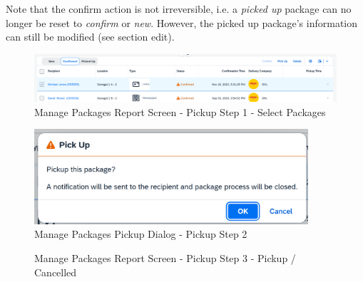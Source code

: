 Note that the confirm action is not irreversible, i.e. a \textit{picked up} package can no longer be reset to \textit{confirm} or \textit{new}. However, the picked up package's information can still be modified (see section edit).

\begin{figure}[H]
	\centering
	\includegraphics[width=1\linewidth]{images/user_doc/managePack/ReportScreen/pickup/pickupEnabled.png}
	\caption{Manage Packages Report Screen - Pickup Step 1 - Select Packages}
	\label{fig:MPReportPickupBtn}
\end{figure}

\begin{figure}[H]
	\centering
	\includegraphics[height=100pt]{images/user_doc/managePack/ReportScreen/pickup/pickupDialogOk.png}
	\caption{Manage Packages Pickup Dialog - Pickup Step 2}
	\label{fig:MPReportPickupDlg}
\end{figure}

\begin{figure}[H]
	\centering
	\hspace{5pt}
    \caption{Manage Packages Report Screen - Pickup Step 3 - Pickup / Cancelled}
	\label{fig:MPReportPickupDlgButton}
\end{figure}

